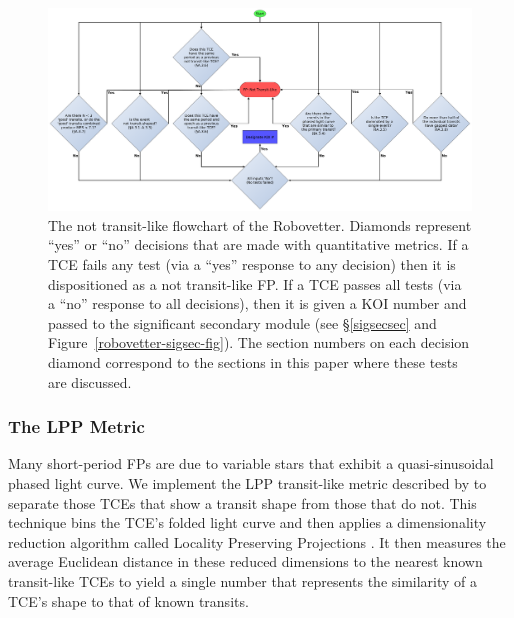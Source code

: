 \begin{figure}[ht]
\centering
\includegraphics[width=\linewidth]{RoboVetter-Diagram-V4-TransitLike.pdf}
\caption{The not transit-like flowchart of the Robovetter. Diamonds represent ``yes'' or ``no'' decisions that are made with quantitative metrics. If a TCE fails any test (via a ``yes'' response to any decision) then it is dispositioned as a not transit-like FP. If a TCE passes all tests (via a ``no'' response to all decisions), then it is given a KOI number and passed to the significant secondary module (see \S\ref{sigsecsec} and Figure~\ref{robovetter-sigsec-fig}). The section numbers on each decision diamond correspond to the sections in this paper where these tests are discussed.}
\label{robovetter-transitlike-fig}
\end{figure}





\subsubsection{The LPP Metric}
\label{s:lpp}

Many short-period FPs are due to variable stars that exhibit a quasi-sinusoidal phased light curve. We implement the LPP transit-like metric described by \citet{Thompson2015b} to separate those TCEs that show a transit shape from those that do not. This technique bins the TCE's folded light curve and then applies a dimensionality reduction algorithm called Locality Preserving Projections \citep[LPP, ][]{He2004}.  It then measures the average Euclidean distance in these reduced dimensions to the nearest known transit-like TCEs to yield a single number that represents the similarity of a TCE's shape to that of known transits. 

